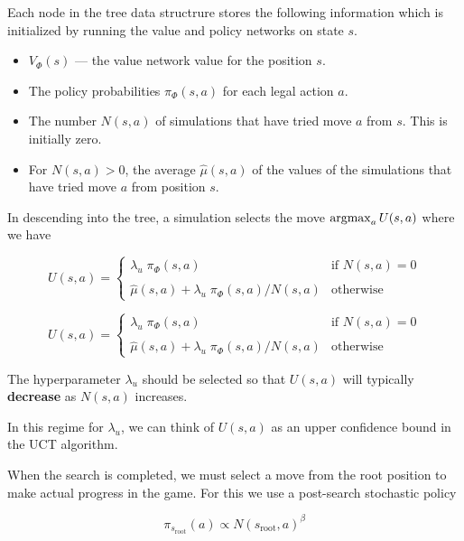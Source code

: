 {

\vfill
Each node in the tree data structrure stores the following information which is initialized
by running the value and policy networks on state $s$.

\begin{itemize}
\item $V_\Phi(s)$ --- the value network value for the position $s$.
\item The policy probabilities $\pi_\Phi(s,a)$ for each legal action $a$.
\item The number $N(s,a)$ of simulations that have tried move $a$ from $s$. This is initially zero.
\item For $N(s,a) > 0$, the average $\hat{\mu}(s,a)$ of the values of the simulations that have
  tried move $a$ from position $s$.
\end{itemize}


In descending into the tree, a simulation selects the move $\operatorname*{argmax}_a U(s,a)$ where we have

\vfill
$$U(s,a) =  \left\{\begin{array}{ll}\lambda_u \;\pi_\Phi(s,a) &\mbox{if $N(s,a) = 0$} \\  \\ \hat{\mu}(s,a) + \lambda_u\; \pi_\Phi(s,a)/N(s,a) & \mbox{otherwise} \end{array}\right.$$

$$U(s,a) =  \left\{\begin{array}{ll}\lambda_u \; \pi_\Phi(s,a) &\mbox{if $N(s,a) = 0$} \\ \\ \hat{\mu}(s,a) + \lambda_u\; \pi_\Phi(s,a)/N(s,a) & \mbox{otherwise} \end{array}\right.$$

\vfill
The hyperparameter $\lambda_u$ should be selected so that $U(s,a)$ will typically {\bf decrease} as $N(s,a)$ increases.

\vfill
In this regime for $\lambda_u$, we can think of $U(s,a)$ as an upper confidence bound in the UCT algorithm.


When the search is completed, we must select a move from the root position to make actual progress in the game.  For this we use a post-search stochastic policy

\vfill
$$\pi_{s_{\mathrm{root}}}(a) \propto N(s_{\mathrm{root}},a)^\beta$$

}
